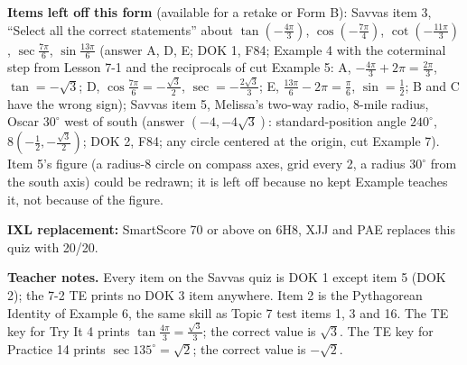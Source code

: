 \documentclass[11pt]{article}
\begin{document}
\textbf{Items left off this form} (available for a retake or Form B):
Savvas item 3, ``Select all the correct statements'' about $\tan\left(-\frac{4\pi}{3}\right)$, $\cos\left(-\frac{7\pi}{4}\right)$, $\cot\left(-\frac{11\pi}{3}\right)$, $\sec\frac{7\pi}{6}$, $\sin\frac{13\pi}{6}$ (answer A, D, E; DOK 1, F84; Example 4 with the coterminal step from Lesson 7-1 and the reciprocals of cut Example 5: A, $-\frac{4\pi}{3}+2\pi=\frac{2\pi}{3}$, $\tan=-\sqrt3$; D, $\cos\frac{7\pi}{6}=-\frac{\sqrt3}{2}$, $\sec=-\frac{2\sqrt3}{3}$; E, $\frac{13\pi}{6}-2\pi=\frac\pi6$, $\sin=\frac12$; B and C have the wrong sign);
Savvas item 5, Melissa's two-way radio, 8-mile radius, Oscar $30^\circ$ west of south (answer $\left(-4,-4\sqrt3\right)$: standard-position angle $240^\circ$, $8\left(-\frac12,-\frac{\sqrt3}{2}\right)$; DOK 2, F84; any circle centered at the origin, cut Example 7). Item 5's figure (a radius-8 circle on compass axes, grid every 2, a radius $30^\circ$ from the south axis) could be redrawn; it is left off because no kept Example teaches it, not because of the figure.

\textbf{IXL replacement:} SmartScore 70 or above on 6H8, XJJ and PAE replaces this quiz with 20/20.

\textbf{Teacher notes.} Every item on the Savvas quiz is DOK 1 except item 5 (DOK 2); the 7-2 TE prints no DOK 3 item anywhere. Item 2 is the Pythagorean Identity of Example 6, the same skill as Topic 7 test items 1, 3 and 16. The TE key for Try It 4 prints $\tan\frac{4\pi}{3}=\frac{\sqrt3}{3}$; the correct value is $\sqrt3$. The TE key for Practice 14 prints $\sec135^\circ=\sqrt2$; the correct value is $-\sqrt2$.
\end{document}
